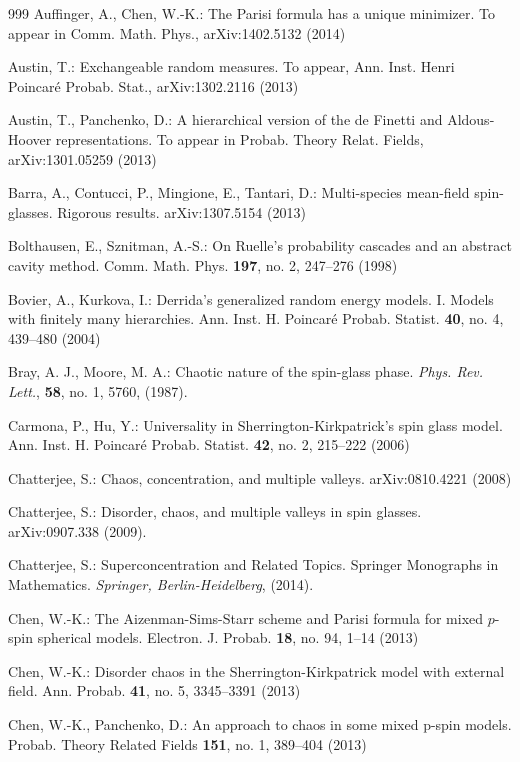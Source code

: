 \documentclass[12pt]{article}
\theoremstyle{nonumberplain}
\begin{document}
\begin{thebibliography}{999}
 Auffinger, A., Chen, W.-K.: The Parisi formula has a unique minimizer. To appear in Comm. Math. Phys., arXiv:1402.5132 (2014)

 Austin, T.: Exchangeable random measures. To appear, Ann. Inst. Henri Poincar\'e Probab. Stat., arXiv:1302.2116 (2013)

 Austin, T., Panchenko, D.: A hierarchical version of the de Finetti and Aldous-Hoover representations. To appear in Probab. Theory Relat. Fields, arXiv:1301.05259 (2013)

 Barra, A., Contucci, P., Mingione, E., Tantari, D.: Multi-species mean-field spin-glasses. Rigorous results.  arXiv:1307.5154 (2013)

 Bolthausen, E., Sznitman, A.-S.: On Ruelle's probability cascades and an abstract cavity method. Comm. Math. Phys. \textbf{197}, no. 2, 247--276 (1998) 

  Bovier, A., Kurkova, I.: Derrida's generalized random energy models. I. Models with finitely many hierarchies.  Ann. Inst. H. Poincar\'e Probab. Statist. \textbf{40},  no. 4, 439--480 (2004)  

 Bray, A. J., Moore, M. A.: Chaotic nature of the spin-glass phase. \emph{Phys. Rev. Lett.}, \textbf{58}, no. 1, 5760, (1987).

 Carmona, P., Hu, Y.: Universality in Sherrington-Kirkpatrick's spin glass model. Ann. Inst. H. Poincar\'e Probab. Statist. \textbf{42}, no. 2, 215--222  (2006)

 Chatterjee, S.: Chaos, concentration, and multiple valleys. arXiv:0810.4221 (2008)

 Chatterjee, S.: Disorder, chaos, and multiple valleys in spin glasses. arXiv:0907.338 (2009).

 Chatterjee, S.: Superconcentration and Related Topics. Springer Monographs in Mathematics. \emph{Springer, Berlin-Heidelberg}, (2014).

 Chen, W.-K.: The Aizenman-Sims-Starr scheme and Parisi formula for mixed $p$-spin spherical models. Electron. J. Probab. \textbf{18}, no. 94, 1--14 (2013)

 Chen, W.-K.: Disorder chaos in the Sherrington-Kirkpatrick model with external field. Ann. Probab. \textbf{41}, no. 5, 3345--3391 (2013)

 Chen, W.-K., Panchenko, D.:  An approach to chaos in some mixed p-spin models. Probab. Theory Related Fields \textbf{151}, no. 1, 389--404 (2013)


\end{thebibliography}
\end{document}
